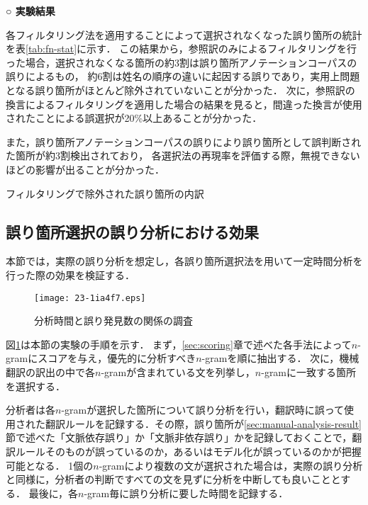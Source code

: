 \documentclass[japanese]{jnlp_1.4}
\newcommand{\textcolor}[2]{}
\begin{document}
\vspace{1\Cvs}
\noindent \textbf{○ 実験結果}

各フィルタリング法を適用することによって選択されなくなった誤り箇所の統計を表\ref{tab:fn-stat}に示す．
この結果から，参照訳のみによるフィルタリングを行った場合，選択されなくなる箇所の約3割は誤り箇所アノテーションコーパスの誤りによるもの，
約6割は姓名の順序の違いに起因する誤りであり，実用上問題となる誤り箇所がほとんど除外されていないことが分かった．
次に，参照訳の換言によるフィルタリングを適用した場合の結果を見ると，間違った換言が使用されたことによる誤選択が20\%以上あることが分かった．

また，誤り箇所アノテーションコーパスの誤りにより誤り箇所として誤判断された箇所が約3割検出されており，
各選択法の再現率を評価する際，無視できないほどの影響が出ることが分かった．

\begin{table}[b]
\caption{フィルタリングで除外された誤り箇所の内訳}
\label{tab:fn-stat}

\end{table}


\subsection{誤り箇所選択の誤り分析における効果}
\label{sec:act-error-analysis}

本節では，実際の誤り分析を想定し，各誤り箇所選択法を用いて一定時間分析を行った際の効果を検証する．

\begin{figure}[b]
\begin{center}
\texttt{[image: 23-1ia4f7.eps]}
\end{center}
\caption{分析時間と誤り発見数の関係の調査}
\label{fig:time-found-flow}
\end{figure}

図\ref{fig:time-found-flow}は本節の実験の手順を示す．
まず，\ref{sec:scoring}章で述べた各手法によって$n$-gramにスコアを与え，優先的に分析すべき$n$-gramを順に抽出する．
次に，機械翻訳の訳出の中で各$n$-gramが含まれている文を列挙し，$n$-gramに一致する箇所を選択する．
\textcolor{black}{その際，\ref{sec:filtering}章で述べたフィルタリング処理を行う．
分析シートは，$n$-gramが正解訳に含まれないものを先に表示し，正解訳に含まれるものを後に表示するようにした．
このようにすることで，分析者はフィルタリングの対象とならなかった結果を優先的に分析しつつ，分析者の時間が許せば，誤ってフィルタリングされた機械翻訳文も分析対象とすることができる．}
分析者は各$n$-gramが選択した箇所について誤り分析を行い，翻訳時に誤って使用された翻訳ルールを記録する．その際，誤り箇所が\ref{sec:manual-analysis-result}節で述べた「文脈依存誤り」か「文脈非依存誤り」かを記録しておくことで，翻訳ルールそのものが誤っているのか，あるいはモデル化が誤っているのかが把握可能となる．
1個の$n$-gramにより複数の文が選択された場合は，実際の誤り分析と同様に，分析者の判断ですべての文を見ずに分析を中断しても良いこととする．
最後に，各$n$-gram毎に誤り分析に要した時間を記録する．
\end{document}
